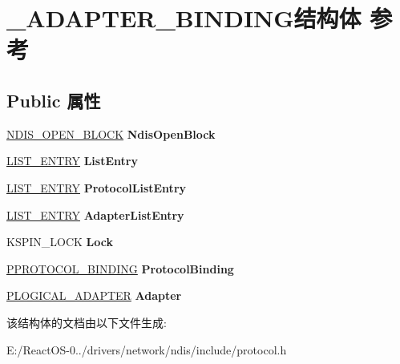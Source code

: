 \hypertarget{struct___a_d_a_p_t_e_r___b_i_n_d_i_n_g}{}\section{\+\_\+\+A\+D\+A\+P\+T\+E\+R\+\_\+\+B\+I\+N\+D\+I\+N\+G结构体 参考}
\label{struct___a_d_a_p_t_e_r___b_i_n_d_i_n_g}
\subsection*{Public 属性}
\begin{DoxyCompactItemize}
\item 
\mbox{\label{struct___a_d_a_p_t_e_r___b_i_n_d_i_n_g_a54f092ea81bb630dff8a4fe69af6b0ac}} 
\hyperlink{struct___n_d_i_s___o_p_e_n___b_l_o_c_k}{N\+D\+I\+S\+\_\+\+O\+P\+E\+N\+\_\+\+B\+L\+O\+CK} {\bfseries Ndis\+Open\+Block}
\item 
\mbox{\label{struct___a_d_a_p_t_e_r___b_i_n_d_i_n_g_afa88a734592d0e904b9d3f459e55ae5d}} 
\hyperlink{struct___l_i_s_t___e_n_t_r_y}{L\+I\+S\+T\+\_\+\+E\+N\+T\+RY} {\bfseries List\+Entry}
\item 
\mbox{\label{struct___a_d_a_p_t_e_r___b_i_n_d_i_n_g_a2fbcb67cbe02d6cc6b81947837788148}} 
\hyperlink{struct___l_i_s_t___e_n_t_r_y}{L\+I\+S\+T\+\_\+\+E\+N\+T\+RY} {\bfseries Protocol\+List\+Entry}
\item 
\mbox{\label{struct___a_d_a_p_t_e_r___b_i_n_d_i_n_g_a8e24cf2e56400441af32866ec672f0c1}} 
\hyperlink{struct___l_i_s_t___e_n_t_r_y}{L\+I\+S\+T\+\_\+\+E\+N\+T\+RY} {\bfseries Adapter\+List\+Entry}
\item 
\mbox{\label{struct___a_d_a_p_t_e_r___b_i_n_d_i_n_g_a4c2de928d7b8b9a8582c1469f2cc63b9}} 
K\+S\+P\+I\+N\+\_\+\+L\+O\+CK {\bfseries Lock}
\item 
\mbox{\label{struct___a_d_a_p_t_e_r___b_i_n_d_i_n_g_a5a0be23ccc449feea6ec3cce20c28cc9}} 
\hyperlink{struct___p_r_o_t_o_c_o_l___b_i_n_d_i_n_g}{P\+P\+R\+O\+T\+O\+C\+O\+L\+\_\+\+B\+I\+N\+D\+I\+NG} {\bfseries Protocol\+Binding}
\item 
\mbox{\label{struct___a_d_a_p_t_e_r___b_i_n_d_i_n_g_a48d82e62efb7bcac8d85d909c0340020}} 
\hyperlink{struct___l_o_g_i_c_a_l___a_d_a_p_t_e_r}{P\+L\+O\+G\+I\+C\+A\+L\+\_\+\+A\+D\+A\+P\+T\+ER} {\bfseries Adapter}
\end{DoxyCompactItemize}


该结构体的文档由以下文件生成\+:\begin{DoxyCompactItemize}
\item 
E\+:/\+React\+O\+S-\/0../drivers/network/ndis/include/protocol.\+h\end{DoxyCompactItemize}
